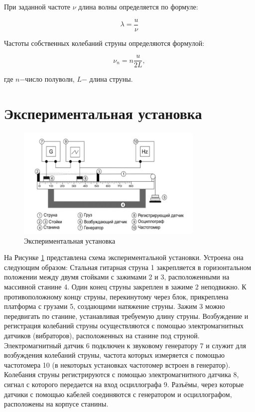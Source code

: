 \documentclass[13pt,a4paper]{article}
\begin{document}
При заданной частоте $\nu$ длина волны определяется по формуле:

\begin{equation}
	\lambda = \frac{u}{\nu}
\end{equation}

Частоты собственных колебаний струны определяются формулой:

\begin{equation}
	\nu_{n} = n\frac{u}{2L},
	\label{eq:frequency_velocity_equation}
\end{equation}

где $n$$-$число полуволн, $L$$-$ длина струны.

\section{Экспериментальная установка}

\begin{figure}[h!]
	\begin{center}
		\includegraphics[width = 0.8\textwidth]{facility}
		\caption{Экспериментальная установка}
		\label{fig:facility}
	\end{center}
\end{figure}

На Рисунке \ref{fig:facility} представлена схема экспериментальной установки. Устроена она следующим образом: Стальная гитарная струна 1 закрепляется в горизонтальном положении между двумя стойками с зажимами 2 и 3,
расположенными на массивной станине 4. Один конец струны закреплен в
зажиме 2 неподвижно. К противоположному концу струны, перекинутому через блок, прикреплена платформа с грузами 5, создающими натяжение
струны. Зажим 3 можно передвигать по станине, устанавливая требуемую
длину струны. Возбуждение и регистрация колебаний струны осуществляются с помощью электромагнитных датчиков (вибраторов), расположенных
на станине под струной. Электромагнитный датчик 6 подключен к звуковому
генератору 7 и служит для возбуждения колебаний струны, частота которых
измеряется с помощью частотомера 10 (в некоторых установках частотомер
встроен в генератор). Колебания струны регистрируются с помощью электромагнитного датчика 8, сигнал с которого передается на вход осциллографа 9.
Разъёмы, через которые датчики с помощью кабелей соединяются с генератором и осциллографом, расположены на корпусе станины.
\end{document}
